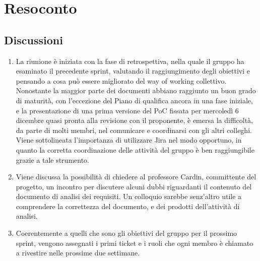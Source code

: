 \section{Resoconto} \label{sec:resoconto}
\subsection{Discussioni} \label{subsec:resdiscussione}
\begin{enumerate}
    \item La riunione è iniziata con la fase di retrospettiva, nella quale il gruppo ha esaminato il precedente sprint, valutando il raggiungimento degli obiettivi e pensando a cosa può essere migliorato del way of working collettivo. Nonostante la maggior parte  dei documenti abbiano raggiunto un buon grado di maturità, con l'eccezione del Piano di qualifica ancora in una fase iniziale, e la presentazione di una prima versione del PoC fissata per mercoledì 6 dicembre quasi pronta alla revisione con il proponente, è emersa la difficoltà, da parte di molti membri, nel comunicare e coordinarsi con gli altri colleghi. Viene sottolineata l'importanza di utilizzare Jira nel modo opportuno,  in quanto la corretta coordinazione delle attività del gruppo è ben raggiungibile grazie a tale strumento.
    \item Viene discussa la possibilità di chiedere al professore Cardin, committente del progetto, un incontro per discutere alcuni dubbi riguardanti il contenuto del documento di analisi dei requisiti. Un colloquio sarebbe senz'altro utile a comprendere la correttezza del documento, e dei prodotti dell'attività di analisi.
    \item Coerentemente a quelli che sono gli obiettivi del gruppo per il prossimo sprint, vengono assegnati i primi ticket e i ruoli che ogni membro è chiamato a rivestire nelle prossime due settimane.
\end{enumerate}

